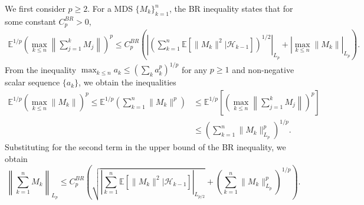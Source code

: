 \documentclass[11pt]{article}
\begin{document}
We first consider $p \geq 2$. 
For a MDS $\{M_k\}_{k=1}^n$, the BR inequality \citep[Theorem 4.1]{pinelis1994optimum} states that for some constant $C_p^{BR} > 0$,
\begin{align*}
    \mathbb{E}^{1/p}  \left(\max_{k \leq n} \left\lVert \sum_{j=1}^k M_j \right\rVert \right)^p
    \leq C_p^{BR} \left( 
    \left\lvert 
    \left( \sum_{k=1}^n \mathbb{E}[\lVert M_k \rVert^2 | \mathcal{H}_{k-1}]\right)^{1/2}
    \right\rvert_{L_p}
    +
    \left\lvert 
    \max_{k \leq n} \lVert M_k \rVert
    \right\rvert_{L_p}
    \right) . 
\end{align*}
From the inequality $\max_{k \leq n} a_k \leq (\sum_k a_k^p)^{1/p}$ for any $p \geq 1$ and non-negative scalar sequence $\{a_k\}$, we obtain the inequalities
\begin{align*}
    \mathbb{E}^{1/p} \left(\max_{k \leq n} \lVert M_k \rVert \right)^p
    \leq 
    \mathbb{E}^{1/p} \left(\sum_{k=1}^n \lVert M_k \rVert^p\right)
    &\leq 
    \mathbb{E}^{1/p}\left[ \left(
    \max_{k \leq n} \left\lVert \sum_{j=1}^k M_j \right\rVert \right)^p
    \right]
    \\ &
    \leq \left(\sum_{k=1}^n \lVert M_k \rVert^p_{L_p} \right)^{1/p}
    . 
\end{align*}
Substituting for the second term in the upper bound of the BR inequality, we obtain
\begin{equation}\label{eq:BR}
    \left\lVert \sum_{k=1}^n M_k \right\rVert_{L_p}
    \leq C_p^{BR} \left(
        \sqrt{\left\lvert \sum_{k=1}^n \mathbb{E}\left[ \lVert M_k \rVert^2 | \mathcal{H}_{k-1} \right] \right\rvert_{L_{p/2}}}
        + \left(\sum_{k=1}^n \lVert M_k \rVert_{L_p}^p
    \right)^{1/p} \right) .
\end{equation}
\end{document}
